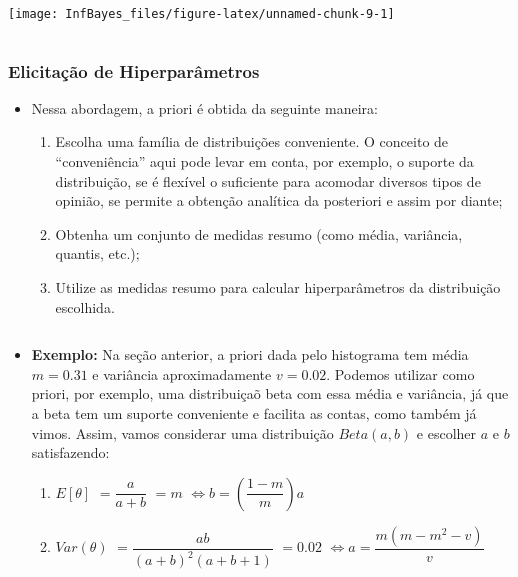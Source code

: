 \documentclass[
]{book}
\providecommand{\tightlist}{%
  \setlength{\itemsep}{0pt}\setlength{\parskip}{0pt}}
\begin{document}
\begin{center}\texttt{[image: InfBayes\_files/figure-latex/unnamed-chunk-9-1]} \end{center}

\(~\)

\hypertarget{elicitauxe7uxe3o-de-hiperparuxe2metros}{%
\subsubsection{Elicitação de Hiperparâmetros}\label{elicitauxe7uxe3o-de-hiperparuxe2metros}}

\begin{itemize}
\tightlist
\item
  Nessa abordagem, a priori é obtida da seguinte maneira:

  \begin{enumerate}
  \def\labelenumi{\arabic{enumi}.}
  \tightlist
  \item
    Escolha uma família de distribuições conveniente. O conceito de ``conveniência'' aqui pode levar em conta, por exemplo, o suporte da distribuição, se é flexível o suficiente para acomodar diversos tipos de opinião, se permite a obtenção analítica da posteriori e assim por diante;\\
  \item
    Obtenha um conjunto de medidas resumo (como média, variância, quantis, etc.);\\
  \item
    Utilize as medidas resumo para calcular hiperparâmetros da distribuição escolhida.
  \end{enumerate}
\end{itemize}

\(~\)

\begin{itemize}
\item
  \textbf{Exemplo:} Na seção anterior, a priori dada pelo histograma tem média \(m=0.31\) e variância aproximadamente \(v=0.02\). Podemos utilizar como priori, por exemplo, uma distribuiçaõ beta com essa média e variância, já que a beta tem um suporte conveniente e facilita as contas, como também já vimos. Assim, vamos considerar uma distribuição \(Beta(a,b)\) e escolher \(a\) e \(b\) satisfazendo:

  \begin{enumerate}
  \def\labelenumi{(\roman{enumi})}
  \tightlist
  \item
    \(E[\theta]\) \(=\dfrac{a}{a+b}\) \(=m\) \(\Longleftrightarrow b=\left(\dfrac{1-m}{m}\right)a\)
  \item
    \(Var(\theta)\) \(=\dfrac{ab}{(a+b)^2(a+b+1)}\) \(=0.02\) \(\Longleftrightarrow a=\dfrac{m(m-m^2-v)}{v}\)
  \end{enumerate}
\end{itemize}
\end{document}
